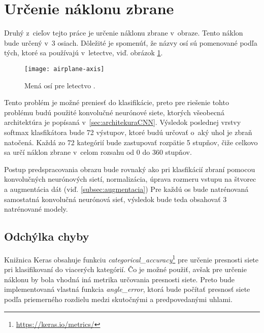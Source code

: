 
\section{Určenie náklonu zbrane}
\label{sec:urcenienaklonuzbrane}
Druhý z~cieľov tejto práce je určenie náklonu zbrane v~obraze.
Tento náklon bude určený v~3 osiach.
Dôležité je spomenúť, že názvy osí sú pomenované podľa tých, ktoré sa používajú v~letectve, viď. obrázok \ref{pic:airplaneaxis}.
\begin{figure}[H]
    \centering
    \texttt{[image: airplane-axis]}
    \caption{Mená osí pre letectvo \cite{odkaz:airplaneaxis}.}
    \label{pic:airplaneaxis}
\end{figure}

Tento problém je možné preniesť do klasifikácie, preto pre riešenie tohto problému budú použité konvolučné neurónové siete, ktorých všeobecná architektúra je popísaná v~\ref{sec:architekuraCNN}.
Výsledok poslednej vrstvy softmax klasfikátora bude 72 výstupov, ktoré budú určovať o~aký uhol je zbraň natočená.
Každá zo 72 kategórií bude zastupovať rozpätie 5 stupňov, čiže celkovo sa určí náklon zbrane v~celom rozsahu od 0 do 360 stupňov.

Postup predspracovania obrazu bude rovnaký ako pri klasfikácií zbraní pomocou konvolučných neurónových sietí, normalizácia, úprava rozmeru vstupu na štvorec a augmentácia dát (viď. \ref{subsec:augmentacia})
Pre každú os bude natrénovaná samostatná konvolučná neurónová sieť, výsledok bude teda obsahovať 3 natrénované modely.

\subsection{Odchýlka chyby}
\label{subsec:odchylkachyby}
Knižnica Keras obsahuje funkciu \textit{categorical\_accuracy}\footnote{\url{https://keras.io/metrics/}} pre určenie presnosti siete pri klasifikovaní do viacerých kategórií.
Čo je možné použiť, avšak pre určenie náklonu by bola vhodná iná metrika určovania presnosti siete.
Preto bude implementovaná vlastná funkcia \textit{angle\_error}, ktorá bude počítať presnosť siete podľa priemerného rozdielu medzi skutočnými a predpovedanými uhlami.
